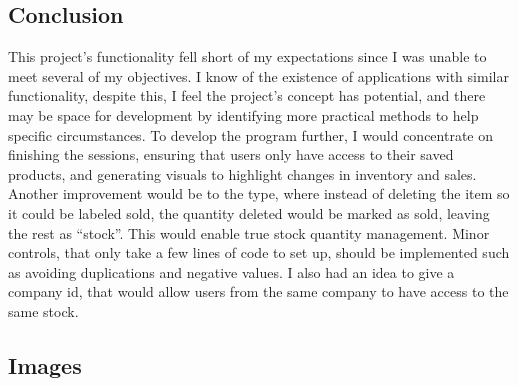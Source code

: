 \hypertarget{conclusion}{%
\subsection{Conclusion}\label{conclusion}}

This project's functionality fell short of my expectations since I was
unable to meet several of my objectives. I know of the existence of
applications with similar functionality, despite this, I feel the
project's concept has potential, and there may be space for development
by identifying more practical methods to help specific circumstances. To
develop the program further, I would concentrate on finishing the
sessions, ensuring that users only have access to their saved products,
and generating visuals to highlight changes in inventory and sales.
Another improvement would be to the type, where instead of deleting the
item so it could be labeled sold, the quantity deleted would be marked
as sold, leaving the rest as ``stock''. This would enable true stock
quantity management. Minor controls, that only take a few lines of code
to set up, should be implemented such as avoiding duplications and
negative values. I also had an idea to give a company id, that would
allow users from the same company to have access to the same stock.

\hypertarget{images}{%
\subsection{Images}\label{images}}

